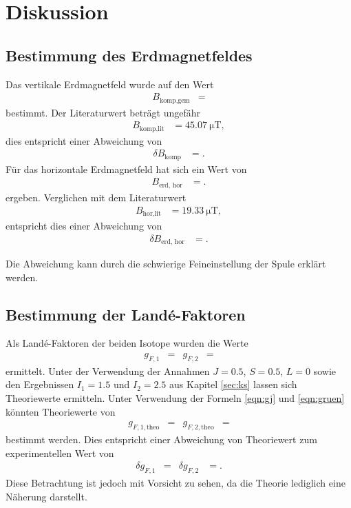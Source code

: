 \section{Diskussion}
\label{sec:Diskussion}

\subsection{Bestimmung des Erdmagnetfeldes}
Das vertikale Erdmagnetfeld wurde auf den Wert
\begin{align*}
  B_\text{komp,gem} &= 
\end{align*}
bestimmt.
Der Literaturwert \cite{magnet} beträgt ungefähr
\begin{align*}
  B_\text{komp,lit} &= \SI{45,07}{\micro\tesla},
\end{align*}
dies entspricht einer Abweichung von
\begin{align*}
  \delta B_\text{komp} &= .
\end{align*}
Für das horizontale Erdmagnetfeld hat sich ein Wert von
\begin{align*}
  B_\text{erd, hor} &= .
\end{align*}
ergeben.
Verglichen mit dem Literaturwert
\begin{align*}
  B_\text{hor,lit} &= \SI{19,33}{\micro\tesla},
\end{align*}
entspricht dies einer Abweichung von
\begin{align*}
  \delta B_\text{erd, hor} &= .
\end{align*}

Die Abweichung kann durch die schwierige Feineinstellung der Spule erklärt werden.%

\subsection{Bestimmung der Land\'{e}-Faktoren}
Als Land\'{e}-Faktoren der beiden Isotope wurden die Werte
\begin{align*}
  g_{F,1} &=  & g_{F,2} &= 
\end{align*}
ermittelt.
Unter der Verwendung der Annahmen $J = \num{0.5}$, $S = \num{0.5}$, $L=\num{0}$ sowie den Ergebnissen $I_1 = \num{1.5}$ und $I_2 = \num{2.5}$ aus Kapitel \ref{sec:ks} lassen sich Theoriewerte ermitteln.
Unter Verwendung der Formeln \eqref{eqn:gj} und \eqref{eqn:gruen} könnten Theoriewerte von
\begin{align*}
  g_{F,1,\text{theo}} &=  & g_{F,2,\text{theo}} &= 
\end{align*}
bestimmt werden.
Dies entspricht einer Abweichung von Theoriewert zum experimentellen Wert von
\begin{align*}
  \delta g_{F,1} &=  & \delta g_{F,2} &= .
\end{align*}
Diese Betrachtung ist jedoch mit Vorsicht zu sehen, da die Theorie lediglich eine Näherung darstellt.

